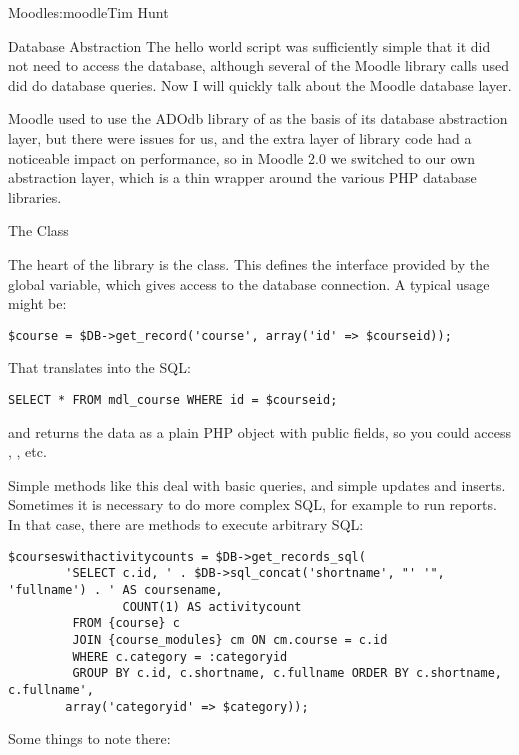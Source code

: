 \begin{aosachapter}{Moodle}{s:moodle}{Tim Hunt}
\begin{aosasect1}{Database Abstraction}
The hello world script was sufficiently simple that it did not need to
access the database, although several of the Moodle library calls used
did do database queries. Now I will quickly talk about the Moodle
database layer.

Moodle used to use the ADOdb library of as the basis of its database
abstraction layer, but there were issues for us, and the extra layer
of library code had a noticeable impact on performance, so in Moodle
2.0 we switched to our own abstraction layer, which is a thin wrapper
around the various PHP database libraries.

\begin{aosasect2}{The  Class}

The heart of the library is the  class. This
defines the interface provided by the  global variable,
which gives access to the database connection. A typical usage might
be:

\begin{verbatim}
$course = $DB->get_record('course', array('id' => $courseid));
\end{verbatim}

That translates into the SQL:

\begin{verbatim}
SELECT * FROM mdl_course WHERE id = $courseid;
\end{verbatim}

\noindent
and returns the data as a plain PHP object with public fields, so you
could access ,
, etc.

Simple methods like this deal with basic queries, and simple updates
and inserts. Sometimes it is necessary to do more complex SQL, for
example to run reports. In that case, there are methods to execute
arbitrary SQL:

\begin{verbatim}
$courseswithactivitycounts = $DB->get_records_sql(
        'SELECT c.id, ' . $DB->sql_concat('shortname', "' '", 'fullname') . ' AS coursename,
                COUNT(1) AS activitycount
         FROM {course} c
         JOIN {course_modules} cm ON cm.course = c.id
         WHERE c.category = :categoryid
         GROUP BY c.id, c.shortname, c.fullname ORDER BY c.shortname, c.fullname',
        array('categoryid' => $category));
\end{verbatim}

\noindent
Some things to note there:


\end{aosasect2}
\end{aosasect1}
\end{aosachapter}
